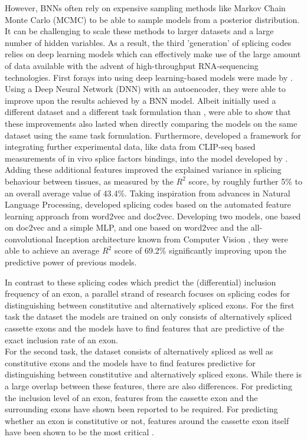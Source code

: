 However, BNNs often rely on expensive sampling methods like Markov Chain Monte Carlo (MCMC) to be able to sample models from a posterior distribution. It can be challenging to scale these methods to larger datasets and a large number of hidden variables.
As a result, the third 'generation' of splicing codes relies on deep learning models which can effectively make use of the large amount of data available with the advent of high-throughput RNA-sequencing technologies. First forays into using deep learning-based models were made by \cite{leung2014}. Using a Deep Neural Network (DNN) with an autoencoder, they were able to improve upon the results achieved by a BNN model. Albeit \cite{leung2014} initially used a different dataset and a different task formulation than \cite{bnnsplicing}, \cite{jha} were able to show that these improvements also lasted when directly comparing the models on the same dataset using the same task formulation. Furthermore, \cite{jha} developed a framework for integrating further experimental data, like data from CLIP-seq based measurements of in vivo splice factors bindings, into the model developed by \cite{leung2014}. Adding these additional features improved the explained variance in splicing behaviour between tissues, as measured by the $R^2$ score, by roughly further 5\% to an overall average value of 43.4\%.
Taking inspiration from advances in Natural Language Processing, \cite{d2vsplicing} developed splicing codes based on the automated feature learning approach from word2vec and doc2vec. Developing two models, one based on doc2vec and a simple MLP, and one based on word2vec and the all-convolutional Inception architecture known from Computer Vision \cite{inception}, they were able to achieve an average $R^2$ score of 69.2\% significantly improving upon the predictive power of previous models.


In contrast to these splicing codes which predict the (differential) inclusion frequency of an exon, a parallel strand of research focuses on splicing codes for distinguishing between constitutive and alternatively spliced exons. For the first task the dataset the models are trained on only consists of alternatively spliced cassette exons and the models have to find features that are predictive of the exact inclusion rate of an exon.\\
For the second task, the dataset consists of alternatively spliced as well as constitutive exons and the models have to find features predictive for distinguishing between constitutive and alternatively spliced exons.
While there is a large overlap between these features, there are also differences.
For predicting the inclusion level of an exon, features from the cassette exon and the surrounding exons have shown been reported to be required. \cite{splicingcodegood1} For predicting whether an exon is constitutive or not, features around the cassette exon itself have been shown to be the most critical \cite{featurearoundexonjunc}. 

